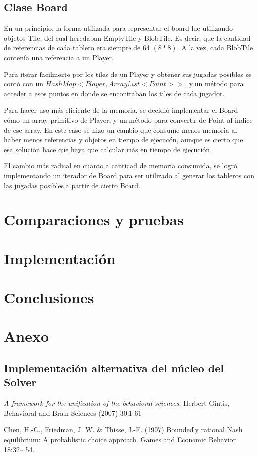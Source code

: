 \documentclass[10pt,a4paper,notitlepage,draft]{article}
\begin{document}
  \subsection{Clase Board}
    En un principio, la forma utilizada para representar el board fue utilizando objetos Tile, del cual heredaban EmptyTile y BlobTile.
    Es decir, que la cantidad de referencias de cada tablero era siempre de 64 $(8 * 8)$.  A la vez, cada BlobTile contenía una referencia a un Player.

    Para iterar facilmente por los tiles de un Player y obtener sus jugadas posibles se contó con un $HashMap<Player, ArrayList<Point>>$, y un método para acceder a esos  puntos en donde se encontraban los tiles de cada jugador.

    Para hacer uso más eficiente de la memoria, se decidió implementar el Board cómo un array primitivo de Player, y un método para convertir de Point al indice de ese array.
    En este caso se hizo un cambio que consume menos memoria al haber menos referencias y objetos en tiempo de ejecucón, aunque es cierto que esa solución hace que haya que calcular más en tiempo de ejecución.

    El cambio más radical en cuanto a cantidad de memoria consumida, se logró implementando un iterador de Board para ser utilizado al generar los tableros con
    las jugadas posibles a partir de cierto Board.

\section{Comparaciones y pruebas}
\section{Implementación}
\section{Conclusiones}
\section{Anexo}
\subsection{Implementación alternativa del núcleo del Solver}
\begin{thebibliography}{9}
   \emph{A framework for the unification of the behavioral sciences}, Herbert Gintis, Behavioral and Brain Sciences (2007) 30:1-61
  
   Chen, H.-C., Friedman, J. W. \& Thisse, J.-F. (1997) Boundedly rational Nash
equilibrium: A probablistic choice approach. Games and Economic Behavior
18:32– 54.

\end{thebibliography}
\end{document}
